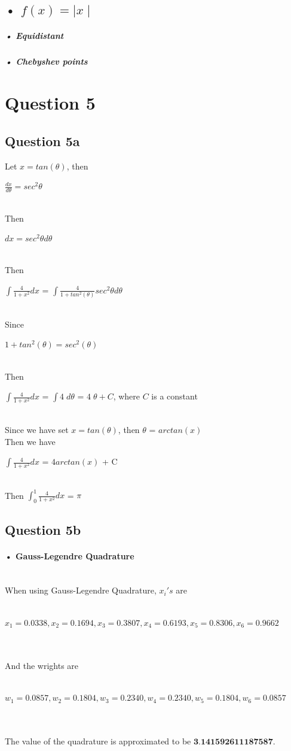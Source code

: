 \documentclass[11pt]{article} %
\begin{document}
\subsection{• $f(x)=\mid x\mid$}
\subparagraph{• Equidistant}
\subparagraph{• Chebyshev points}
\section{Question 5}
\subsection{Question 5a}
Let $x = tan(\theta)$, then\\
\centerline{$\frac{dx}{d\theta} = sec^{2}\theta$}\\
Then\\
\centerline{$dx = sec^{2}\theta d\theta$}\\
Then\\
\centerline{$\int\frac{4}{1+x^2}dx$ = $\int\frac{4}{1+tan^2(\theta)}sec^{2}\theta d\theta$}\\
Since\\
\centerline{$1+tan^2(\theta) = sec^{2}(\theta)$}\\
Then\\
\centerline{$\int\frac{4}{1+x^2}dx$ = $\int 4\;d\theta$ = $4\;\theta + C$, where $C$ is a constant}\\
Since we have set $x = tan(\theta)$, then $\theta$ = $arctan(x)$\\
Then we have \\
\centerline{$\int\frac{4}{1+x^2}dx$ = $4arctan(x)$ + C}\\
Then $\int_{0}^{1}\frac{4}{1+x^2}dx$ = $\pi$
\subsection{Question 5b}
\paragraph{• Gauss-Legendre Quadrature}\mbox{}\\
When using Gauss-Legendre Quadrature, $x_{i}'s$ are\\\\
\centerline{$x_{1} = 0.0338,x_{2}= 0.1694,x_{3}= 0.3807,x_{4}=0.6193,x_{5}=0.8306,x_{6}= 0.9662$}\\\\
And the wrights are\\\\
\centerline{$w_{1}=0.0857,w_{2}=0.1804,w_{3}=0.2340,w_{4}=0.2340,w_{5}=0.1804,w_{6}=0.0857$}\\\\
The value of the quadrature is approximated to be $\textbf{3.141592611187587}$.
\end{document}
